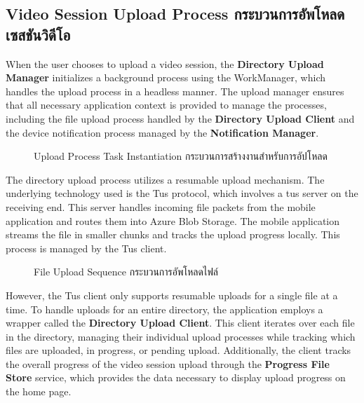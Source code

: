 \subsection{\ifenglish Video Session Upload Process \else กระบวนการอัพโหลดเซสชันวิดีโอ \fi}
When the user chooses to upload a video session, the \textbf{Directory Upload Manager} initializes a background process using the WorkManager, which handles the upload process in a headless manner. The upload manager ensures that all necessary application context is provided to manage the processes, including the file upload process handled by the \textbf{Directory Upload Client} and the device notification process managed by the \textbf{Notification Manager}.

\begin{figure}[h]
    \begin{center}
    
    \end{center}
    \newcommand{\WorkManagerInstantiation}{\ifenglish Upload Process Task Instantiation \else กระบวนการสร้างงานสำหรับการอัปโหลด \fi}
    \caption[\WorkManagerInstantiation]{\WorkManagerInstantiation}
    \label{fig:workmanager instantiation}
\end{figure}

The directory upload process utilizes a resumable upload mechanism. The underlying technology used is the Tus protocol, which involves a tus server on the receiving end. This server handles incoming file packets from the mobile application and routes them into Azure Blob Storage. The mobile application streams the file in smaller chunks and tracks the upload progress locally. This process is managed by the Tus client.

\begin{figure}[h]
    \begin{center}
    
    \end{center}
    \newcommand{\FileUploadSequence}{\ifenglish File Upload Sequence \else กระบวนการอัพโหลดไฟล์ \fi}
    \caption[\FileUploadSequence]{\FileUploadSequence}
    \label{fig file upload quence}
\end{figure}

However, the Tus client only supports resumable uploads for a single file at a time. To handle uploads for an entire directory, the application employs a wrapper called the \textbf{Directory Upload Client}. This client iterates over each file in the directory, managing their individual upload processes while tracking which files are uploaded, in progress, or pending upload. Additionally, the client tracks the overall progress of the video session upload through the \textbf{Progress File Store} service, which provides the data necessary to display upload progress on the home page.


